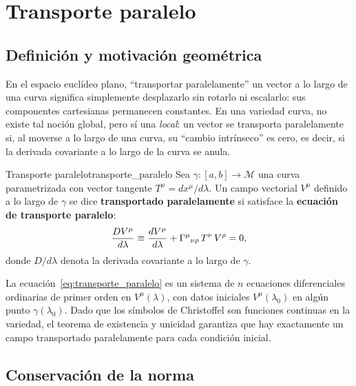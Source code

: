 \section{Transporte paralelo}
\label{sec:paralelo}

\subsection{Definición y motivación geométrica}

En el espacio euclídeo plano, ``transportar paralelamente'' un vector a lo largo de una curva significa simplemente desplazarlo sin rotarlo ni escalarlo: sus componentes cartesianas permanecen constantes. En una variedad curva, no existe tal noción global, pero sí una \emph{local}: un vector se transporta paralelamente si, al moverse a lo largo de una curva, su ``cambio intrínseco'' es cero, es decir, si la derivada covariante a lo largo de la curva se anula.

\begin{definicion}{Transporte paralelo}{transporte_paralelo}
Sea $\gamma: [a,b] \to \mathcal{M}$ una curva parametrizada con vector tangente $T^\mu = dx^\mu/d\lambda$. Un campo vectorial $V^\mu$ definido a lo largo de $\gamma$ se dice \textbf{transportado paralelamente} si satisface la \textbf{ecuación de transporte paralelo}:
\begin{equation}
  \frac{DV^\mu}{d\lambda} \equiv \frac{dV^\mu}{d\lambda} + \Gamma^{\mu}{}_{\nu \rho}\, T^\nu\, V^\rho = 0,
  \label{eq:transporte_paralelo}
\end{equation}
donde $D/d\lambda$ denota la derivada covariante a lo largo de $\gamma$.
\end{definicion}

La ecuación~\eqref{eq:transporte_paralelo} es un sistema de $n$ ecuaciones diferenciales ordinarias de primer orden en $V^\mu(\lambda)$, con datos iniciales $V^\mu(\lambda_0)$ en algún punto $\gamma(\lambda_0)$. Dado que los símbolos de Christoffel son funciones continuas en la variedad, el teorema de existencia y unicidad garantiza que hay exactamente un campo transportado paralelamente para cada condición inicial.

\subsection{Conservación de la norma}

